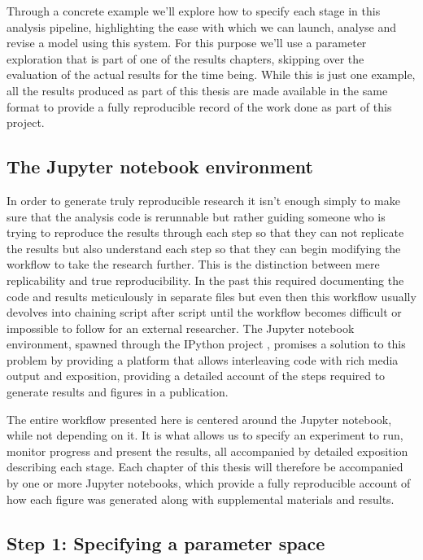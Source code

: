 Through a concrete example we'll explore how to specify each stage in
this analysis pipeline, highlighting the ease with which we can
launch, analyse and revise a model using this system. For this purpose
we'll use a parameter exploration that is part of one of the results
chapters, skipping over the evaluation of the actual results for the
time being. While this is just one example, all the results produced
as part of this thesis are made available in the same format to
provide a fully reproducible record of the work done as part of this
project.

\subsection{The Jupyter notebook environment}

In order to generate truly reproducible research it isn't enough
simply to make sure that the analysis code is rerunnable but rather
guiding someone who is trying to reproduce the results through each
step so that they can not replicate the results but also understand
each step so that they can begin modifying the workflow to take the
research further. This is the distinction between mere replicability
and true reproducibility. In the past this required documenting the
code and results meticulously in separate files but even then this
workflow usually devolves into chaining script after script until the
workflow becomes difficult or impossible to follow for an external
researcher. The Jupyter notebook environment, spawned through the
IPython project \citep{Perez2007}, promises a solution to this problem
by providing a platform that allows interleaving code with rich media
output and exposition, providing a detailed account of the steps
required to generate results and figures in a publication.

The entire workflow presented here is centered around the Jupyter
notebook, while not depending on it. It is what allows us to specify
an experiment to run, monitor progress and present the results, all
accompanied by detailed exposition describing each stage. Each chapter
of this thesis will therefore be accompanied by one or more Jupyter
notebooks, which provide a fully reproducible account of how each
figure was generated along with supplemental materials and results.

\subsection{Step 1: Specifying a parameter space}

